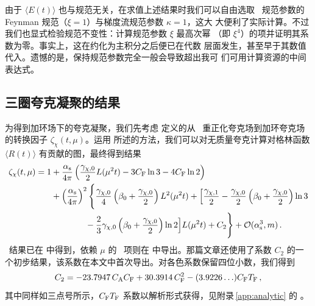 由于 $\langle E(t) \rangle$ 也与规范无关，在求值上述结果时我们可以自由选取
\qcd\ 规范参数的 Feynman 规范（$\xi=1$）与梯度流规范参数 $\kappa = 1$，这大
大便利了实际计算。不过我们也显式检验规范不变性：计算规范参数 $\xi$ 最高次幂
（即 $\xi^4$）的项并证明其系数为零。事实上，这在约化为主积分之后便已在代数
层面发生，甚至早于其数值代入。遗憾的是，保持规范参数完全一般会导致超出我可
们可用计算资源的中间表达式。

\subsection{三圈夸克凝聚的结果}

为得到加环场下的夸克凝聚，我们先考虑  定义的从 \msbar\
重正化夸克场到加环夸克场的转换因子 $\zeta_\chi(t,\mu)$。运用
 所述的方法，我们可以对无质量夸克计算对格林函数 $\langle
R(t)\rangle$ 有贡献的图，最终得到结果
\begin{equation}
	\begin{split}
	  \zeta_\chi(t,\mu) = 1 &+ \frac{\alpha_\mathrm{s}}{4\pi} \left(
          \frac{\gamma_{\chi, 0}}{2} L(\mu^2t) - 3 C_\mathrm{F} \ln 3 - 4 C_\mathrm{F} \ln
          2 \right) \\ &+ \left(\frac{\alpha_\mathrm{s}}{4\pi}\right)^2 \Bigg\{
          \frac{\gamma_{\chi, 0}}{4} \left( \beta_0 +
          \frac{\gamma_{\chi, 0}}{2} \right) L^2 (\mu^2t) + \Big[
            \frac{\gamma_{\chi, 1}}{2} - \frac{\gamma_{\chi, 0}}{2}
            \left( \beta_0 + \frac{\gamma_{\chi, 0}}{2} \right) \ln 3
            \\ & \qquad \qquad - \frac{2}{3} \gamma_{\chi, 0} \left(
            \beta_0 + \frac{\gamma_{\chi, 0}}{2}\right) \ln 2 \Big]
          L(\mu^2t) + C_2 \Bigg\} + {\cal O}(\alpha_\mathrm{s}^3,m) \,.
                \label{eq:zfchi}
	\end{split}
\end{equation}
\nlo\ 结果已在  中得到，依赖 $\mu$ 的 \nnlo\ 项则在
 中导出。那篇文章还使用了系数 $C_2$
的一个初步结果，该系数在本文中首次导出。对各色系数保留四位小数，我们得到
\begin{equation}
  C_2 = -23.7947 \, C_\mathrm{A} C_\mathrm{F} + 30.3914 \, C_\mathrm{F}^2 -(3.9226\ldots) C_\mathrm{F}
  T_\mathrm{F}\,,
  \label{eq:c2}
\end{equation}
其中同样如三点号所示，$C_\mathrm{F}T_\mathrm{F}$ 系数以解析形式获得，见附录\,\ref{app:analytic}
的 。

